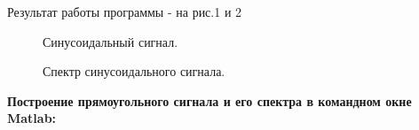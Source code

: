 \documentclass[12pt,a4paper]{scrartcl}
\begin{document}
Результат работы программы - на рис.1 и 2\\
\begin{figure}[h!]
	\caption{Синусоидальный сигнал.}
\end{figure}
\begin{figure}[h!]
	\caption{Спектр синусоидального сигнала.}
\end{figure}
\newpage
\textbf{Построение прямоугольного сигнала и его спектра в командном окне Matlab:\\}
\end{document}
